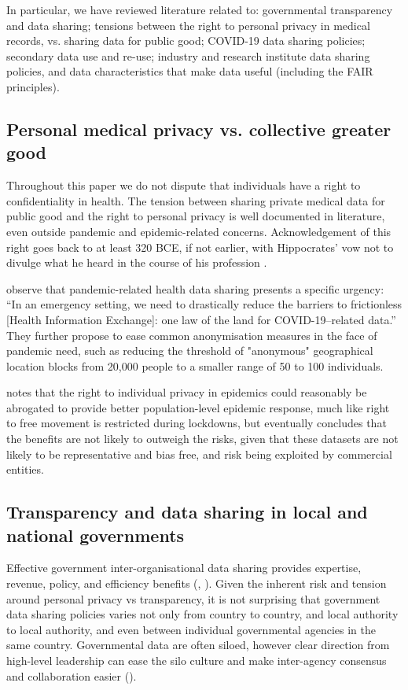 \documentclass{CUP-JNL-DAP}%
\begin{document}
In particular, we have reviewed literature related to: governmental transparency and data sharing; tensions between the right to personal privacy in medical records, vs. sharing data for public good; COVID-19 data sharing policies; secondary data use and re-use; industry and research institute data sharing policies, and data characteristics that make data useful (including the FAIR principles). 

\subsection{Personal medical privacy vs. collective greater good} 
Throughout this paper we do not dispute that individuals have a right to confidentiality in health. The tension between sharing private medical data for public good and the right to personal privacy is well documented in literature, even outside pandemic and epidemic-related concerns.  Acknowledgement of this right goes back to at least 320 BCE, if not earlier, with Hippocrates' vow not to divulge what he heard in the course of his profession \cite{jones_hippocrates}.  

\cite{Leslie_McSwain} observe that pandemic-related health data sharing presents a specific urgency: \enquote{In an emergency setting, we need to drastically reduce the barriers to frictionless [Health Information Exchange]: one law of the land for COVID-19–related data.} They further propose to ease common anonymisation measures in the face of pandemic need, such as reducing the threshold of "anonymous" geographical location blocks from 20,000 people to a smaller range of 50 to 100 individuals. 

\cite{henderson_patient_2021} notes that the right to individual privacy in epidemics could reasonably be abrogated to provide better population-level epidemic response, much like right to free movement is restricted during lockdowns, but eventually concludes that the benefits are not likely to outweigh the risks, given that these datasets are not likely to be representative and bias free, and risk being exploited by commercial entities.

\subsection{Transparency and data sharing in local and national governments}

Effective government inter-organisational data sharing provides expertise, revenue, policy, and efficiency benefits (\cite{gil-garcia_government_2016}, \cite{ramon_gil-garcia_collaborative_2007}). Given the inherent risk and tension around personal privacy vs transparency, it is not surprising that government data sharing policies varies not only from country to country, and local authority to local authority, and even between individual governmental agencies in the same country. Governmental data are often siloed, however clear direction from high-level leadership can ease the silo culture and make inter-agency consensus and collaboration easier (\cite{graham_navigating_2016}). 
\end{document}
